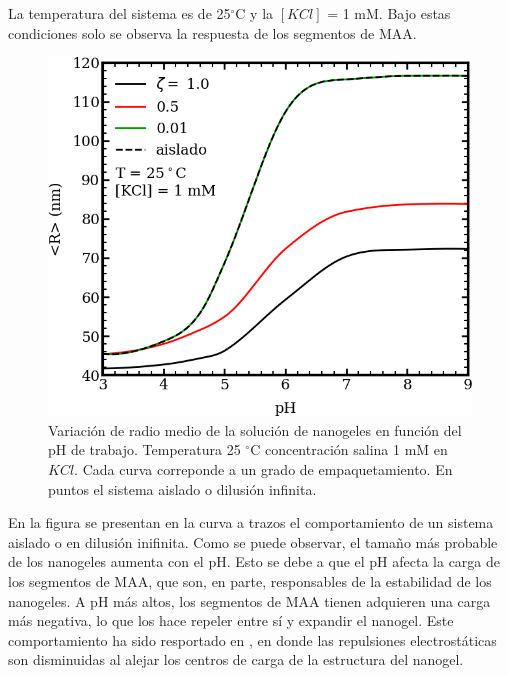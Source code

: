 	La temperatura del sistema es de 25$^\circ$C y la $[KCl]$ = 1 mM. Bajo estas condiciones solo se observa la respuesta de los segmentos de MAA.
	
	
	
	
	\begin{figure}[!htb]
		\centering
		\includegraphics[width=0.45\linewidth]{Figures/graph-mc/rvspH-phis.png}
		\caption{Variaci\'on de radio medio de la soluci\'on de nanogeles en funci\'on del pH de trabajo. Temperatura 25 $^\circ$C concentraci\'on salina 1 mM en $KCl$. Cada curva correponde a un grado de empaquetamiento. En puntos el sistema aislado o dilusi\'on infinita.}
		\label{fig:mc:rvspH}
	\end{figure}
	
	
	En la figura se presentan en la curva a trazos el comportamiento de un sistema aislado o en dilusi\'on inifinita.
	Como se puede observar, el tama\~no m\'as probable de los nanogeles aumenta con el pH. Esto se debe a que el pH afecta la carga de los segmentos de MAA, que son, en parte,  responsables de la estabilidad de los nanogeles. A pH m\'as altos, los segmentos de MAA tienen adquieren una carga m\'as negativa, lo que los hace repeler entre s\'i y expandir el nanogel.
	Este comportamiento ha sido resportado en \cite{perez2021thermodynamic}, en donde las repulsiones electrost\'aticas son disminuidas al alejar los centros de carga de la estructura del nanogel.
	
